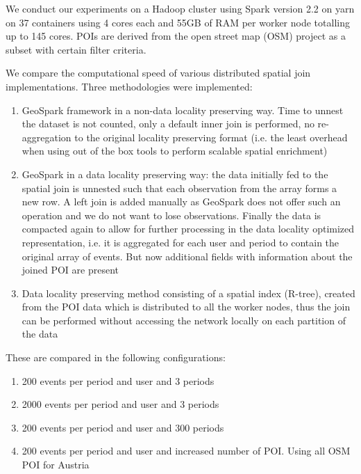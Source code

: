 \documentclass[conference]{IEEEtran}
\begin{document}
We conduct our experiments on a Hadoop cluster using Spark version 2.2 on yarn on 37 containers
 using 4 cores each and 55GB of RAM per worker node totalling up to 145 cores. POIs are derived from the open street map (OSM) project as a subset with certain filter criteria.

We compare the computational speed of various distributed spatial join implementations. Three methodologies were implemented: 
\begin{enumerate}
  \item GeoSpark framework in a non-data locality preserving way. Time to unnest the dataset is not counted, only a default inner join is performed, no re-aggregation to the original locality preserving format (i.e. the least overhead when using out of the box tools to perform scalable spatial enrichment)
  \item GeoSpark in a data locality preserving way: the data initially fed to the spatial join is unnested such that each observation from the array forms a new row. A left join is added manually as GeoSpark does not offer such an operation and we do not want to lose observations. Finally the data is compacted again to allow for further processing in the data locality optimized representation, i.e. it is aggregated for each user and period to contain the original array of events. But now additional fields with information about the joined POI are present
  \item Data locality preserving method consisting of a spatial index (R-tree), created from the POI data which is distributed to all the worker nodes, thus the join can be performed without accessing the network locally on each partition of the data
\end{enumerate}

These are compared in the following configurations:
\begin{enumerate}
	\item 200 events per period and user and 3 periods
	\item 2000 events per period and user and 3 periods
	\item 200 events per period and user and 300 periods
	\item 200 events per period and user and increased number of POI. Using all OSM POI for Austria
\end{enumerate}
\end{document}
